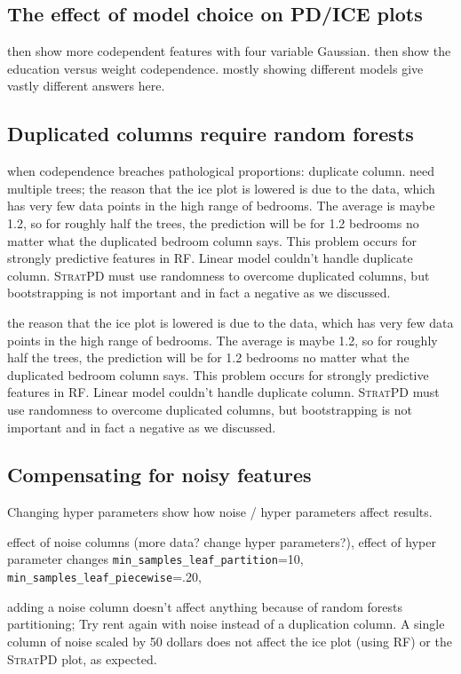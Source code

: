 \documentclass[12pt]{article}
\newcommand{\spd}{\fontfamily{cmr}\textsc{\small StratPD}}
\begin{document}
\subsection{The effect of model choice on PD/ICE plots}

then show more codependent features with four variable Gaussian. then show the education versus weight codependence.  mostly showing different models give vastly different answers here.

\subsection{Duplicated columns require random forests}\label{sec:dup}

when codependence breaches pathological proportions: duplicate column. need multiple trees; the reason that the ice plot is lowered is due to the data, which has very few data points in the high range of bedrooms. The average is maybe 1.2, so for roughly half the trees, the prediction will be for 1.2 bedrooms no matter what the duplicated bedroom column says.  This problem occurs for strongly predictive features in RF. Linear model couldn't handle duplicate column. \spd{} must use randomness to overcome duplicated columns, but bootstrapping is not important and in fact a negative as we discussed.

the reason that the ice plot is lowered is due to the data, which has very few data points in the high range of bedrooms. The average is maybe 1.2, so for roughly half the trees, the prediction will be for 1.2 bedrooms no matter what the duplicated bedroom column says.  This problem occurs for strongly predictive features in RF. Linear model couldn't handle duplicate column. \spd{} must use randomness to overcome duplicated columns, but bootstrapping is not important and in fact a negative as we discussed. 

\subsection{Compensating for noisy features}\label{sec:noise}

Changing hyper parameters
show how noise /  hyper parameters affect results.

effect of noise columns (more data? change hyper parameters?), effect of hyper parameter changes
                 {\tt min\_samples\_leaf\_partition}=10,
                 {\tt min\_samples\_leaf\_piecewise}=.20,

adding a noise column doesn't affect anything because of random forests partitioning; Try rent again with noise instead of a duplication column. A single column of noise scaled by 50 dollars does not affect the ice plot (using RF) or the \spd{} plot, as expected.
\end{document}
